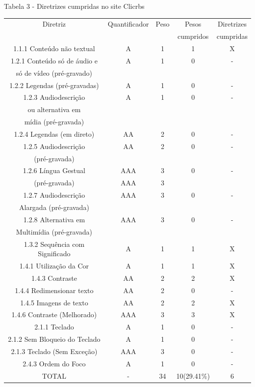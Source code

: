 \documentclass[a4paper]{article}
\begin{document}
\begin{titlepage}
Tabela 3 - Diretrizes cumpridas no site Clicrbs\\[-1cm]
\begin{center}
	\fontsize{8pt}{8pt}\selectfont	
	\begin{longtable}{|c|c|c|c|c|}
		\hline
		Diretriz & Quantificador & Peso & Pesos & Diretrizes\\
		& & & cumpridos & cumpridas\\
		\hline
		1.1.1 Conteúdo não textual & A & 1 & 1 & X \\
		\hline
		1.2.1 Conteúdo só de áudio e & A & 1 & 0 & - \\
		só de vídeo (pré-gravado) & & & & \\
		\hline
		1.2.2 Legendas (pré-gravadas) & A & 1 & 0 & - \\
		\hline
		1.2.3 Audiodescrição & A & 1 & 0 & - \\
		ou alternativa em & & & & \\
		mídia (pré-gravada) & & & & \\
		\hline
		1.2.4 Legendas (em direto) & AA & 2 & 0 & - \\
		\hline
		1.2.5 Audiodescrição & AA & 2 & 0 & - \\
		(pré-gravada) & & & & \\
		\hline
		1.2.6 Língua Gestual & AAA & 3 & 0 & - \\
		(pré-gravada) & AAA & 3 & & \\
		\hline
		1.2.7 Audiodescrição & AAA & 3 & 0 & - \\
		Alargada (pré-gravada) & & & & \\
		\hline
		1.2.8 Alternativa em & AAA & 3 & 0 & - \\
		Multimídia (pré-gravada) & & & & \\
		\hline
		1.3.2 Sequência com Significado & A & 1 & 1 & X \\
		\hline
		1.4.1 Utilização da Cor & A & 1 & 1 & X \\
		\hline
		1.4.3 Contraste & AA & 2 & 2 & X \\
		\hline
		1.4.4 Redimensionar texto & AA & 2 & 0 & - \\
		\hline
		1.4.5 Imagens de texto & AA & 2 & 2 & X \\
		\hline
		1.4.6 Contraste (Melhorado) & AAA & 3 & 3 & X \\
		\hline
		2.1.1 Teclado & A & 1 & 0 & - \\
		\hline
		2.1.2 Sem Bloqueio do Teclado & A & 1 & 0 & - \\
		\hline
		2.1.3 Teclado (Sem Exceção) & AAA & 3 & 0 & - \\
		\hline
		2.4.3 Ordem do Foco & A & 1 & 0 & - \\
		\hline
		TOTAL & - & 34 & 10(29.41\%) & 6 \\
		\hline
	\end{longtable}
\end{center}


\end{titlepage}
\end{document}
